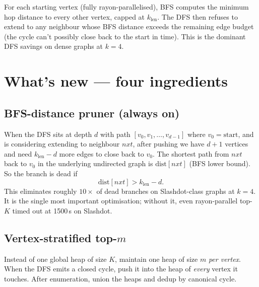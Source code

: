 \documentclass[11pt,a4paper]{article}
\begin{document}
For each starting vertex (fully rayon-parallelised), BFS computes the
minimum hop distance to every other vertex, capped at $k_{\text{len}}$.
The DFS then refuses to extend to any neighbour whose BFS distance
exceeds the remaining edge budget (the cycle can't possibly close
back to the start in time). This is the dominant DFS savings on
dense graphs at $k=4$.

\section{What's new --- four ingredients}

\subsection{BFS-distance pruner (always on)}

When the DFS sits at depth $d$ with path
$[v_0, v_1, \ldots, v_{d-1}]$ where $v_0 = \text{start}$, and is
considering extending to neighbour $\mathit{nxt}$, after pushing we
have $d+1$ vertices and need $k_{\text{len}} - d$ more edges to close
back to $v_0$. The shortest path from $\mathit{nxt}$ back to $v_0$
in the underlying undirected graph is $\text{dist}[\mathit{nxt}]$
(BFS lower bound). So the branch is dead if
\[
   \text{dist}[\mathit{nxt}] > k_{\text{len}} - d.
\]
This eliminates roughly $10\times$ of dead branches on
Slashdot-class graphs at $k=4$. It is the single most important
optimisation; without it, even rayon-parallel top-$K$ timed out at
1500\,s on Slashdot.

\subsection{Vertex-stratified top-$m$}

Instead of one global heap of size $K$, maintain one heap of size
$m$ \emph{per vertex}. When the DFS emits a closed cycle, push it
into the heap of \emph{every} vertex it touches. After enumeration,
union the heaps and dedup by canonical cycle.
\end{document}
